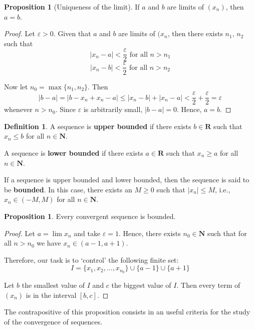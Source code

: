 \documentclass[tikz,12pt,a4paper]{article}
\theoremstyle{definition}
\newtheorem{proposition}[theorem]{Proposition}
\newtheorem{definition}{Definition}[section]
\begin{document}
\begin{proposition}[Uniqueness of the limit]
	If $a$ and $b$ are limits of $(x_n)$, then $a=b$.
\end{proposition}

\begin{proof}
	Let $\varepsilon > 0$. Given that $a$ and $b$ are limits of $(x_n$, then there exists $n_1$, $n_2$ such that
	\[
		| x_n - a | < \frac{\varepsilon}{2} \text{ for all } n > n_1
	\]
	\[
		| x_n - b | < \frac{\varepsilon}{2} \text{ for all } n > n_2
	\]
	
	Now let $n_0 = \max \{ n_1, n_2 \}$. Then
	\[
		| b - a | = | b - x_n + x_n - a | \leq |x_n - b| + |x_n - a| < \frac{\varepsilon}{2} + \frac{\varepsilon}{2} = \varepsilon
	\]
	whenever $n > n_0$. Since $\varepsilon$ is arbitrarily small, $|b-a| = 0$. Hence, $a = b$. 
\end{proof}

\begin{definition}
	A sequence is \textbf{upper bounded} if there exists $b \in \textbf{R}$ such that $x_n \leq b$ for all $n \in \textbf{N}$.
	
	A sequence is \textbf{lower bounded} if there exists $a \in \textbf{R}$ such that $x_n \geq a$ for all $n \in \textbf{N}$.
	
	If a sequence is upper bounded and lower bounded, then the sequence is said to be \textbf{bounded}. In this case, there exists an $M \geq 0$ such that $| x_n | \leq M$, i.e., $x_n \in (-M, M)$ for all $n \in \textbf{N}$.
\end{definition}

\begin{proposition}
	Every convergent sequence is bounded.
\end{proposition}

\begin{proof}
	Let $a = \lim x_n$ and take $\varepsilon = 1$. Hence, there exists $n_0 \in \textbf{N}$ such that for all $n > n_0$ we have $x_n \in (a-1, a+1)$. 
	
	Therefore, our task is to `control' the following finite set: \[ I = \{ x_1, x_2, \ldots, x_{n_0} \} \cup \{a-1\} \cup \{a+1\} \]
	
	Let $b$ the smallest value of $I$ and $c$ the biggest value of $I$. Then every term of $(x_n)$ is in the interval $[ b, c ]$.
\end{proof}

The contrapositive of this proposition consists in an useful criteria for the study of the convergence of sequences.
\end{document}

